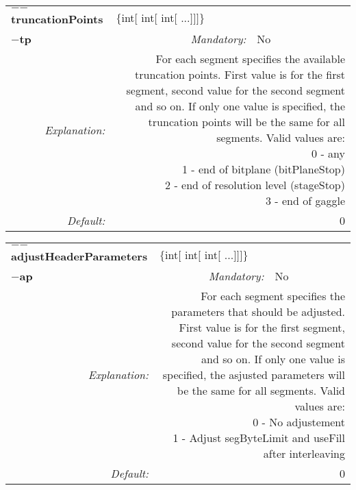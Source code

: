 \begin{center}\begin{tabular}{|rr|rlrl|}
\hline
\multicolumn{2}{|l|}{\textbf{$-$$-$truncationPoints}} & \multicolumn{4}{|l|}{$\{$int$[$ int$[$ int$[$ ...$]$$]$$]$$\}$} \\
\cline{3-6}
\multicolumn{2}{|l|}{\textbf{$-$tp}} & \emph{Mandatory:} & No & &  \\
\hline
\emph{Explanation:} & \multicolumn{5}{|p{12cm}|}{For each segment specifies the available truncation points. First value is for the first segment, second value for the second segment and so on. If only one value is specified, the truncation points will be the same for all segments. Valid values are:\newline 0 - any \newline 1 - end of bitplane (bitPlaneStop) \newline 2 - end of resolution level (stageStop) \newline 3 - end of gaggle} \\
\hline
\emph{Default:} & \multicolumn{5}{|p{12cm}|}{0 } \\
\hline
\end{tabular}\end{center}
\begin{center}\begin{tabular}{|rr|rlrl|}
\hline
\multicolumn{2}{|l|}{\textbf{$-$$-$adjustHeaderParameters}} & \multicolumn{4}{|l|}{$\{$int$[$ int$[$ int$[$ ...$]$$]$$]$$\}$} \\
\cline{3-6}
\multicolumn{2}{|l|}{\textbf{$-$ap}} & \emph{Mandatory:} & No & &  \\
\hline
\emph{Explanation:} & \multicolumn{5}{|p{12cm}|}{For each segment specifies the parameters that should be adjusted. First value is for the first segment, second value for the second segment and so on. If only one value is specified, the asjusted parameters will be the same for all segments. Valid values are:\newline 0 - No adjustement  \newline 1 - Adjust segByteLimit and useFill after interleaving } \\
\hline
\emph{Default:} & \multicolumn{5}{|p{12cm}|}{0 } \\
\hline
\end{tabular}\end{center}
